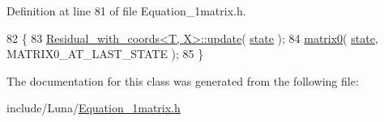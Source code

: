 Definition at line 81 of file Equation\+\_\+1matrix.\+h.


\begin{DoxyCode}
82  \{
83      \hyperlink{classLuna_1_1Residual_ac1f39e77c729e6a4a1e10ac951f6c704}{Residual\_with\_coords<T, X>::update}( \hyperlink{classLuna_1_1Residual_a41d9f863aa529f16c5d78fb19b4906bd}{state} );
84      \hyperlink{classLuna_1_1Equation__1matrix_a7e0adf303491e67602d5e34ab7ec3ada}{matrix0}( \hyperlink{classLuna_1_1Residual_a41d9f863aa529f16c5d78fb19b4906bd}{state}, MATRIX0\_AT\_LAST\_STATE );
85  \}
\end{DoxyCode}


The documentation for this class was generated from the following file\+:\begin{DoxyCompactItemize}
\item 
include/\+Luna/\hyperlink{Equation__1matrix_8h}{Equation\+\_\+1matrix.\+h}\end{DoxyCompactItemize}
